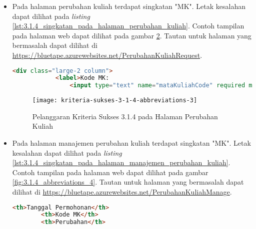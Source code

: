 \begin{itemize}
    \begin{figure}[H]
        \centering  
        \texttt{[image: kriteria-sukses-3-1-4-abbreviations-2]}  
        \caption[Pelanggaran Kriteria Sukses 3.1.4 pada Halaman Manajemen Cetak Transkrip]{Pelanggaran Kriteria Sukses 3.1.4 pada Halaman Manajemen Cetak Transkrip}
        \label{fig:3.1.4_abbreviations_2}  
    \end{figure}
    
    \item Pada halaman perubahan kuliah terdapat singkatan "MK". Letak kesalahan dapat dilihat pada \textit{listing} \ref{lst:3.1.4_singkatan_pada_halaman_perubahan_kuliah}. Contoh tampilan pada halaman web dapat dilihat pada gambar \ref{fig:3.1.4_abbreviations_3}. Tautan untuk halaman yang bermasalah dapat dilihat di \url{https://bluetape.azurewebsites.net/PerubahanKuliahRequest}.
    \begin{lstlisting}[frame=single, label={lst:3.1.4_singkatan_pada_halaman_perubahan_kuliah}, language=HTML, caption=Pelanggaran Kriteria Sukses 3.1.4 pada Halaman Perubahan Kuliah]
        <div class="large-2 column">
            <label>Kode MK:
                <input type="text" name="mataKuliahCode" required maxlength="9" pattern="[A-Z]{3}[0-9]{3}([0-9]{3})?" title="Kode MK dalam format XYZ123"/>
    \end{lstlisting}

    \begin{figure}[H]
        \centering  
        \texttt{[image: kriteria-sukses-3-1-4-abbreviations-3]}  
        \caption[Pelanggaran Kriteria Sukses 3.1.4 pada Halaman Perubahan Kuliah]{Pelanggaran Kriteria Sukses 3.1.4 pada Halaman Perubahan Kuliah}
        \label{fig:3.1.4_abbreviations_3}  
    \end{figure}
    
    \item Pada halaman manajemen perubahan kuliah terdapat singkatan "MK". Letak kesalahan dapat dilihat pada \textit{listing} \ref{lst:3.1.4_singkatan_pada_halaman_manajemen_perubahan_kuliah}. Contoh tampilan pada halaman web dapat dilihat pada gambar \ref{fig:3.1.4_abbreviations_4}. Tautan untuk halaman yang bermasalah dapat dilihat di \url{https://bluetape.azurewebsites.net/PerubahanKuliahManage}.
    \begin{lstlisting}[frame=single, label={lst:3.1.4_singkatan_pada_halaman_manajemen_perubahan_kuliah}, language=HTML, caption=Pelanggaran Kriteria Sukses 3.1.4 pada Halaman Manajemen Perubahan Kuliah]
        <th>Tanggal Permohonan</th>
        <th>Kode MK</th>
        <th>Perubahan</th>
    \end{lstlisting}


\end{itemize}
